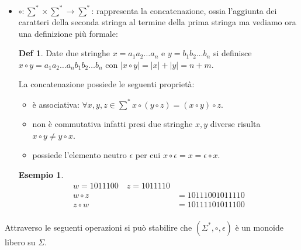 \documentclass[a4paper]{book}
\theoremstyle{definition}%
\newtheorem*{defi}{Def}%
\newtheorem*{esempio}{Esempio}
\begin{document}
\begin{itemize}
  \item $\circ: \sum ^ * \times \sum ^ * \to \sum ^ *$: rappresenta la concatenazione, ossia l'aggiunta dei caratteri della seconda stringa al termine della prima stringa ma vediamo ora una definizione più formale:
        \begin{defi}
          Date due stringhe $x = a_1 a_2 \dots a_n$ e $y = b_1 b_2 \dots b_n$ si definisce $x \circ y = a_1 a_2 \dots a_n b_1 b_2 \dots b_n$
          con $|x \circ y| = |x| + |y| = n + m$.
        \end{defi}
        La concatenazione possiede le seguenti proprietà:
        \begin{itemize}
        \item è associativa: $\forall x,y,z \in \sum^* x \circ (y \circ z) = (x \circ y) \circ z$.
        \item non è commutativa infatti presi due stringhe $x,y$ diverse risulta $x \circ y \neq y \circ x$.
        \item possiede l'elemento neutro $\epsilon$ per cui $x \circ \epsilon = x = \epsilon \circ x$.
        \end{itemize}
        \begin{esempio}
          \begin{equation*}
          \begin{split}
            w = 1011100 \quad z = 1011110  \\
            w \circ z & = 10111001011110 \\
            z \circ w  &= 10111101011100 \\
          \end{split}
          \end{equation*}
        \end{esempio}
  \end{itemize}
Attraverso le seguenti operazioni si può stabilire che $(\Sigma ^ *,\circ,\epsilon)$ è un monoide libero su $\Sigma$.
\end{document}
